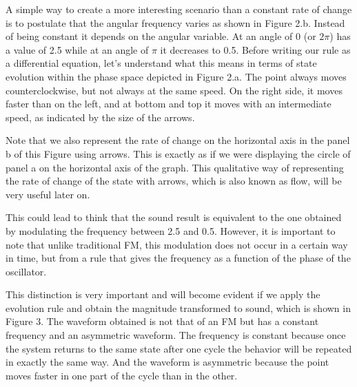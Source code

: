 \documentclass{article}
\begin{document}
A simple way to create a more interesting scenario than a constant rate of change is to postulate that the angular frequency varies as shown in Figure 2.b. 
Instead of being constant it depends on the angular variable. 
At an angle of 0 (or $2\pi$) has a value of 2.5 while at an angle of $\pi$ it decreases to 0.5.
Before writing our rule as a differential equation, let’s understand what this means in terms of state evolution within the phase space depicted in Figure 2.a. 
The point always moves counterclockwise, but not always at the same speed. On the right side, it moves faster than on the left, and at bottom and top it moves with an intermediate speed, as indicated by the size of the arrows.

Note that we also represent the rate of change on the horizontal axis in the panel b of this Figure using arrows. 
This is exactly as if we were displaying the circle of panel a on the horizontal axis of the graph. 
This qualitative way of representing the rate of change of the state with arrows, which is also known as flow, will be very useful later on.

This could lead to think that the sound result is equivalent to the one obtained by modulating the frequency between 2.5 and 0.5. 
However, it is important to note that unlike traditional FM, this modulation does not occur in a certain way in time, but from a rule that gives the frequency as a function of the phase of the oscillator. 


This distinction is very important and will become evident if we apply the evolution rule and obtain the magnitude transformed to sound, which is shown in Figure 3. 
The waveform obtained is not that of an FM but has a constant frequency and an asymmetric waveform. 
The frequency is constant because once the system returns to the same state after one cycle the behavior will be repeated in exactly the same way. 
And the waveform is asymmetric because the point moves faster in one part of the cycle than in the other.
\end{document}
